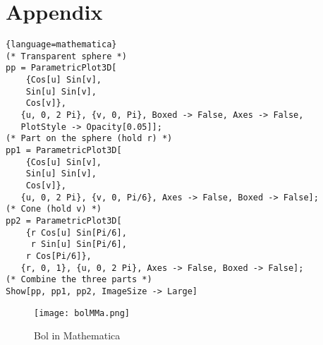 \documentclass{article}
\begin{document}
    \section{Appendix}\label{sec:appendix}
    \begin{lstlisting}{language=mathematica}
(* Transparent sphere *)
pp = ParametricPlot3D[
    {Cos[u] Sin[v],
    Sin[u] Sin[v],
    Cos[v]},
   {u, 0, 2 Pi}, {v, 0, Pi}, Boxed -> False, Axes -> False,
   PlotStyle -> Opacity[0.05]];
(* Part on the sphere (hold r) *)
pp1 = ParametricPlot3D[
    {Cos[u] Sin[v],
    Sin[u] Sin[v],
    Cos[v]},
   {u, 0, 2 Pi}, {v, 0, Pi/6}, Axes -> False, Boxed -> False];
(* Cone (hold v) *)
pp2 = ParametricPlot3D[
    {r Cos[u] Sin[Pi/6],
     r Sin[u] Sin[Pi/6],
    r Cos[Pi/6]},
   {r, 0, 1}, {u, 0, 2 Pi}, Axes -> False, Boxed -> False];
(* Combine the three parts *)
Show[pp, pp1, pp2, ImageSize -> Large]
    \end{lstlisting}
    \begin{figure}[h!]
        \centering
        \texttt{[image: bolMMa.png]}
    \caption{Bol in Mathematica}\label{bolMMa}
    \end{figure}
\end{document}
